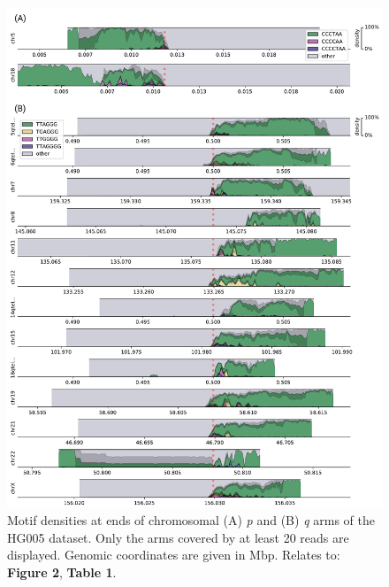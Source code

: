\documentclass{article}
\begin{document}
\begin{figure}[ht!] \centering
\includegraphics[height=.95\textheight,width=\textwidth,keepaspectratio]{figures/threemotifp/HG005-densityplots-threemotifp.pdf}
\caption{
    Motif densities at ends of chromosomal (A) \textit{p} and (B) \textit{q} arms of the HG005 dataset.
    Only the arms covered by at least 20 reads are displayed.
    Genomic coordinates are given in Mbp.
    Relates to: \textbf{Figure 2}, \textbf{Table 1}.
}
\label{fig:hg005_densityplots}
\end{figure}
\clearpage \pagebreak
\end{document}
